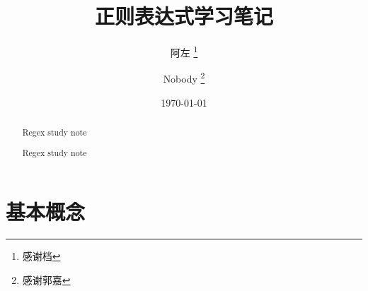 \documentclass[a4paper]{report}
\title{正则表达式学习笔记}                             %
\author{                                     %
		阿左 \thanks{感谢档} \and 
		Nobody \thanks{感谢郭嘉}
	}
\date{\today}                                %
\begin{document}
	\maketitle                                   %
	\tableofcontents                             %
	\setcounter{tocdepth}{5}                     %
	\listoffigures                               %
	\listoftables                                %


	\begin{abstract}                             %
		Regex study note
	\end{abstract}

	\renewcommand{\abstractname}{摘要}           %
	\begin{abstract}
		Regex study note
	\end{abstract}

	\part{基本概念}

		
\end{document}
